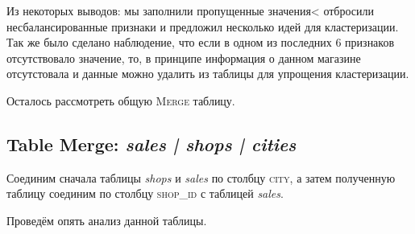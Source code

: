 \documentclass[%
10pt, %
final, %
oneside, %
onecolumn, %
centertags]{article} %
\theoremstyle{plain}
\theoremstyle{definition}
\theoremstyle{remark}
\begin{document}
Из некоторых выводов: мы заполнили пропущенные значения< отбросили несбалансированные признаки и предложил несколько идей для кластеризации. Так же было сделано наблюдение, что если в одном из последних $6$ признаков отсутствовало значение, то, в принципе информация о данном магазине отсутстовала и данные можно удалить из таблицы для упрощения кластеризации. 

Осталось рассмотреть общую \textsc{Merge} таблицу. 

\subsection{Table Merge: \textit{sales | shops | cities}}

Соединим сначала таблицы \textit{shops} и \textit{sales} по столбцу \textsc{city}, а затем полученную таблицу соединим по столбцу \textsc{shop\_id} с таблицей \textit{sales}.

Проведём опять анализ данной таблицы. 
\end{document}
